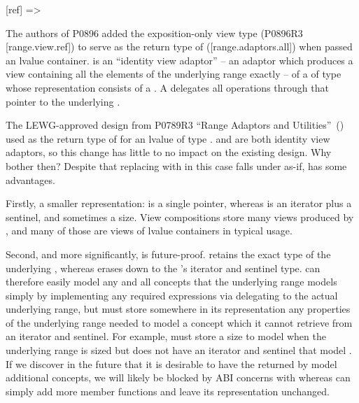 [ref]{ => }

The authors of P0896 added the exposition-only view type 
(P0896R3 [range.view.ref]) to serve as the return type of  
([range.adaptors.all]) when passed an lvalue container.
 is an ``identity view adaptor'' --
an adaptor which produces a view containing all the elements of the underlying
range exactly -- of a  of type  whose representation
consists of a . A  delegates all
operations through that pointer to the underlying .

The LEWG-approved design from
P0789R3 ``Range Adaptors and Utilities''~(\cite{P0789})
used  as the return type of
 for an lvalue  of type .
 and  are both identity view adaptors, so
this change has little to no impact on the existing design. Why bother then?
Despite that replacing  with  in this case
falls under as-if,  has some advantages.

Firstly, a smaller representation:  is a single pointer,
whereas  is an iterator plus a sentinel, and sometimes a size.
View compositions store many views produced by , and many of
those are views of lvalue containers in typical usage.

Second, and more significantly,  is future-proof.
 retains the exact type of the underlying
, whereas  erases down to the
's iterator and sentinel type. 
can therefore easily model any and all concepts that the underlying range models
simply by implementing any required expressions via delegating to the actual
underlying range, but  must store somewhere in its
representation any properties of the underlying range needed to model a
concept which it cannot retrieve from an iterator and sentinel. For example,
 must store a size to model  when the
underlying range is sized but does not have an iterator and sentinel that model
. If we discover in the future that it is desirable
to have the  returned by  model
additional concepts, we will likely be blocked by ABI concerns with
 whereas  can simply add more member
functions and leave its representation unchanged.

